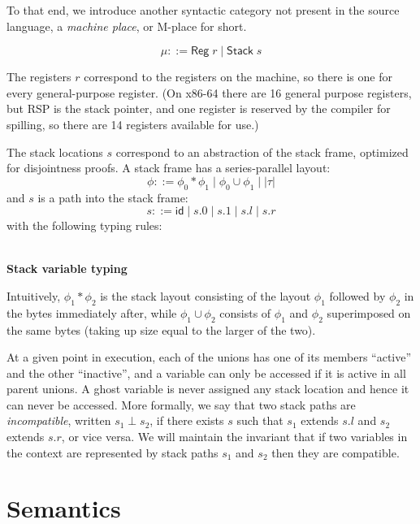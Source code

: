 \documentclass[acmsmall,nonacm]{acmart}
\newcommand{\proves}{\vdash}
\newcommand{\judgment}[2][]{\noindent\\\textbf{#1}\hspace{\stretch{1}}\fbox{$#2$}\nopagebreak}
\newcommand*{\axiom}[2][]{\infer[#1]{}{#2}}
\begin{document}
To that end, we introduce another syntactic category not present in the source language, a \emph{machine place}, or M-place for short.

$$\mu::=\mathsf{Reg}\;r\mid \mathsf{Stack}\;s$$

The registers $r$ correspond to the registers on the machine, so there is one for every general-purpose register. (On x86-64 there are 16 general purpose registers, but RSP is the stack pointer, and one register is reserved by the compiler for spilling, so there are 14 registers available for use.)

The stack locations $s$ correspond to an abstraction of the stack frame, optimized for disjointness proofs. A stack frame has a series-parallel layout:
$$\phi ::= \phi_0\ast\phi_1\mid \phi_0\cup \phi_1\mid |\tau|$$
and $s$ is a path into the stack frame:
$$s ::= \mathsf{id}\mid s.0\mid s.1 \mid s.l \mid s.r$$
with the following typing rules:

\judgment[Stack variable typing]{\phi\proves s:\phi'}

Intuitively, $\phi_1\ast\phi_2$ is the stack layout consisting of the layout $\phi_1$ followed by $\phi_2$ in the bytes immediately after, while $\phi_1\cup\phi_2$ consists of $\phi_1$ and $\phi_2$ superimposed on the same bytes (taking up size equal to the larger of the two).

At a given point in execution, each of the unions has one of its members ``active'' and the other ``inactive'', and a variable can only be accessed if it is active in all parent unions.
A ghost variable is never assigned any stack location and hence it can never be accessed. More formally, we say that two stack paths are \emph{incompatible}, written $s_1\perp s_2$, if there exists $s$ such that $s_1$ extends $s.l$ and $s_2$ extends $s.r$, or vice versa. We will maintain the invariant that if two variables in the context are represented by stack paths $s_1$ and $s_2$ then they are compatible.

\section{Semantics}\label{sec:semantics}
\end{document}
